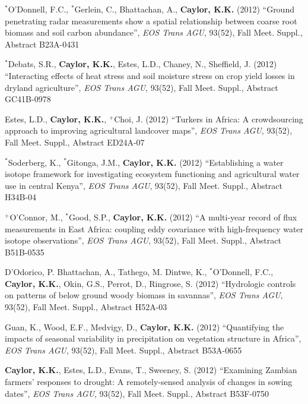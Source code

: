 \documentclass[10pt]{report}
\begin{document}
\begin{etaremune}
\item $^{*}$O'Donnell, F.C., $^{*}$Gerlein, C., Bhattachan, A., \textbf{Caylor, K.K.} (2012) ``Ground penetrating radar measurements show a spatial relationship between coarse root biomass and soil carbon abundance'', \emph{EOS Trans AGU}, 93(52), Fall Meet. Suppl., Abstract B23A-0431

\item $^{*}$Debats, S.R., \textbf{Caylor, K.K.}, Estes, L.D., Chaney, N., Sheffield, J. (2012) ``Interacting effects of heat stress and soil moisture stress on crop yield losses in dryland agriculture'', \emph{EOS Trans AGU}, 93(52), Fall Meet. Suppl., Abstract GC41B-0978

\item Estes, L.D., \textbf{Caylor, K.K.}, $^{+}$Choi, J. (2012) ``Turkers in Africa: A crowdsourcing approach to improving agricultural landcover maps'', \emph{EOS Trans AGU}, 93(52), Fall Meet. Suppl., Abstract ED24A-07

\item $^{*}$Soderberg, K., $^{*}$Gitonga, J.M., \textbf{Caylor, K.K.} (2012) ``Establishing a water isotope framework for investigating ecosystem functioning and agricultural water use in central Kenya'', \emph{EOS Trans AGU}, 93(52), Fall Meet. Suppl., Abstract H34B-04

\item $^{+}$O'Connor, M., $^{*}$Good, S.P., \textbf{Caylor, K.K.} (2012) ``A multi-year record of flux measurements in East Africa: coupling eddy covariance with high-frequency water isotope observations'', \emph{EOS Trans AGU}, 93(52), Fall Meet. Suppl., Abstract B51B-0535

\item D'Odorico, P. Bhattachan, A., Tathego, M. Dintwe, K., $^{*}$O'Donnell, F.C., \textbf{Caylor, K.K.}, Okin, G.S., Perrot, D., Ringrose, S. (2012) ``Hydrologic controls on patterns of below ground woody biomass in savannas'', \emph{EOS Trans AGU}, 93(52), Fall Meet. Suppl., Abstract H52A-03 

\item Guan, K., Wood, E.F., Medvigy, D., \textbf{Caylor, K.K.} (2012) ``Quantifying the impacts of seasonal variability in precipitation on vegetation structure in Africa'', \emph{EOS Trans AGU}, 93(52), Fall Meet. Suppl., Abstract B53A-0655

\item \textbf{Caylor, K.K.}, Estes, L.D., Evans, T., Sweeney, S. (2012) ``Examining Zambian farmers' responses to drought: A remotely-sensed analysis of changes in sowing dates'', \emph{EOS Trans AGU}, 93(52), Fall Meet. Suppl., Abstract B53F-0750


\end{etaremune}
\end{document}
